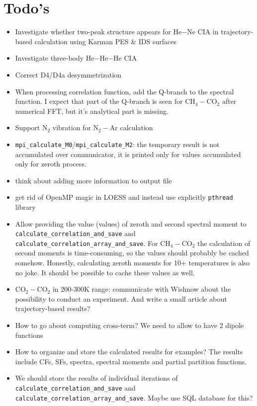 \documentclass{article}
\begin{document}
\section{Todo's}

\begin{itemize}
    \item Investigate whether two-peak structure appears for He$-$Ne CIA in trajectory-based calculation using Karman PES \& IDS surfaces
    \item Investigate three-body He$-$He$-$He CIA \cite{Kowalski2014}
    \item Correct D4/D4a desymmetrization
    \item When processing correlation function, add the Q-branch to the spectral function. I expect that part of the Q-branch is seen for CH$_4-$CO$_2$ after numerical FFT, but it's analytical part is missing. 
    \item Support N$_2$ vibration for N$_2-$Ar calculation 
    \item \texttt{mpi\_calculate\_M0}/\texttt{mpi\_calculate\_M2}: the temporary result is not accumulated over communicator, it is printed only for values accumulated only for zeroth process.
    \item think about adding more information to output file
    \item get rid of OpenMP magic in LOESS and instead use explicitly \texttt{pthread} library 
    \item Allow providing the value (values) of zeroth and second spectral moment to \texttt{calculate\_correlation\_and\_save} and \texttt{calculate\_correlation\_array\_and\_save}. {\color{red} For CH$_4-$CO$_2$ the calculation of second moments is time-consuming, so the values should probably be cached somehow. Honestly, calculating zeroth moments for 10+ temperatures is also no joke. It should be possible to cache these values as well.}
    \item CO$_2-$CO$_2$ in 200-300K range: communicate with Wishnow about the possibility to conduct an experiment. And write a small article about trajectory-based results?
    \item How to go about computing cross-term? We need to allow to have 2 dipole functions
    \item How to organize and store the calculated results for examples? The results include CFs, SFs, spectra, spectral moments and partial partition functions.
    \item We should store the results of individual iterations of \texttt{calculate\_correlation\_and\_save} and \texttt{calculate\_correlation\_array\_and\_save}. Maybe use SQL database for this?

\end{itemize}
\end{document}
